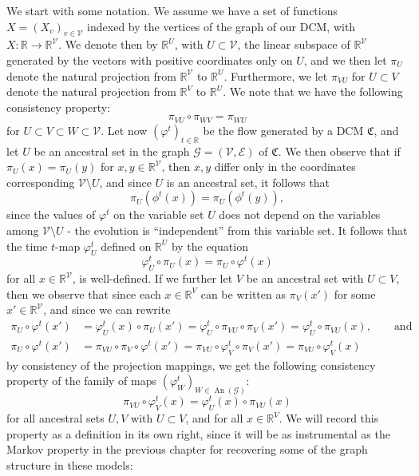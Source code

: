 \documentclass[11pt, a4paper]{memoir}
\theoremstyle{break}
\theoremstyle{break}
\theoremstyle{nonumberplain}
\newcommand{\mR}{\mathbb{R}}
\DeclareMathOperator{\an}{An}
\begin{document}
We start with some notation. We assume we have a set of functions $X=(X_v)_{v\in \mathcal{V}}$ indexed by the vertices of the graph of our DCM, with $X:\mR\to\mR^\mathcal{V}$. We denote then by $\mR^U$, with $U\subset \mathcal{V}$, the linear subspace of $\mR^{\mathcal{V}}$ generated by the vectors with positive coordinates only on $U$, and we then let $\pi_{U}$ denote the natural projection from $\mR^{\mathcal{V}}$ to $\mR^{U}$. Furthermore, we let $\pi_{VU}$ for $U\subset V$ denote the natural projection from $\mR^V$ to $\mR^U$. We note that we have the following consistency property:
$$\pi_{VU}\circ \pi_{WV}=\pi_{WU}$$
for $U\subset V\subset W\subset\mathcal{V}$. Let now $(\varphi^t)_{t\in \mR}$ be the flow generated by a DCM $\mathfrak{C}$, and let $U$ be an ancestral set in the graph $\mathcal{G}=(\mathcal{V},\mathcal{E})$ of $\mathfrak{C}$. We then observe that if $\pi_U(x)=\pi_U(y)$ for $x,y\in \mR^\mathcal{V}$, then $x,y$ differ only in the coordinates corresponding $\mathcal{V}\setminus U$, and since $U$ is an ancestral set, it follows that $$\pi_U(\phi^t(x))=\pi_U(\phi^t(y)),$$
since the values of $\varphi^t$ on the variable set $U$ does not depend on the variables among $\mathcal{V}\setminus U$ - the evolution is \enquote{independent} from this variable set. It follows that the time $t$-map $\varphi_U^t$ defined on $\mR^U$ by the equation
$$\varphi^t_U\circ\pi_U(x)=\pi_U\circ \varphi^t(x)$$
for all $x\in \mR^{\mathcal{V}}$, is well-defined. If we further let $V$ be an ancestral set with $U\subset V$, then we observe that since each $x\in \mR^V$ can be written as $\pi_V(x')$ for some $x'\in \mR^{\mathcal{V}}$, and since we can rewrite
\begin{align*}
\pi_U\circ\varphi^t(x')
&=\varphi_U^t(x)\circ\pi_U(x')=
\varphi_U^t\circ\pi_{VU}\circ\pi_V(x')=\varphi_U^t\circ\pi_{VU}(x),\quad\quad \text{and}\\
\pi_U\circ\varphi^t(x')&=\pi_{VU}\circ \pi_V\circ\varphi^t(x')=\pi_{VU}\circ \varphi_V^t\circ \pi_V(x')=\pi_{VU}\circ\varphi_V^t(x)
\end{align*}
by consistency of the projection mappings, we get the following consistency property of the family of maps $(\varphi_W^{t})_{W\in \an(\mathcal{G})}$:
$$\pi_{VU}\circ \varphi_V^t(x)=\varphi_U^t(x)\circ\pi_{VU}(x)$$
for all ancestral sets $U,V$ with $U\subset V$, and for all $x\in \mR^V$. We will record this property as a definition in its own right, since it will be as instrumental as the Markov property in the previous chapter for recovering some of the graph structure in these models:
\end{document}
